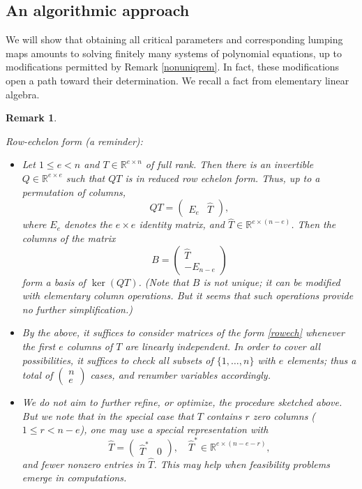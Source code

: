 \documentclass{article}
\newtheorem{remark}{Remark}
\begin{document}
\subsection{An algorithmic approach}
 We will show that obtaining all critical parameters and corresponding lumping maps amounts to solving finitely many systems of polynomial equations, up to modifications permitted by Remark \ref{nonuniqrem}. In fact, these modifications open a path toward their determination. We recall a fact from elementary linear algebra.
\begin{remark}\label{rrerem}{\em Row-echelon form (a reminder):
\begin{itemize}
    \item Let $1\leq e<n$ and $T\in\mathbb R^{e\times n}$ of full rank. Then there is an invertible $Q\in\mathbb R^{e\times e}$ such that $QT$ is in reduced row echelon form. Thus, up to a permutation of columns,
    \begin{equation}\label{rowech}
         QT=\begin{pmatrix}
        E_e & \widehat T
    \end{pmatrix},
    \end{equation}
    where $E_e $ denotes the $e\times e$  identity matrix, and $\widehat T\in\mathbb R^{e\times(n-e)}$. Then the columns of the matrix 
    \[
    B=\begin{pmatrix}
        \widehat T\\ -E_{n-e}
    \end{pmatrix}
    \]
    form a basis of $\ker (QT)$. (Note that $B$ is not unique; it can be modified with elementary column operations. But it seems that such operations provide no further simplification.)
    \item By the above, it suffices to consider matrices of the form \eqref{rowech} whenever the first $e$ columns of $T$ are linearly independent. In order to cover all possibilities, it suffices to check all subsets of $\{1,\ldots,n\}$ with $e$ elements; thus a total of $\begin{pmatrix}
        n\\e
    \end{pmatrix}$ cases, and renumber variables accordingly.
    \item We do not aim to further refine, or optimize, the procedure sketched above. But we note that in the special case that $T$ contains $r$ zero columns ($1\leq r<n-e$), one may use a special representation with 
    \[
    \widehat T=\begin{pmatrix}
        \widehat T^*& 0
    \end{pmatrix}, \quad \widehat T^*\in \mathbb R^{e\times (n-e-r)},
    \]
    and fewer nonzero entries in $\widehat T$. This may help when feasibility problems emerge in computations.
\end{itemize}
}
\end{remark}
\end{document}
